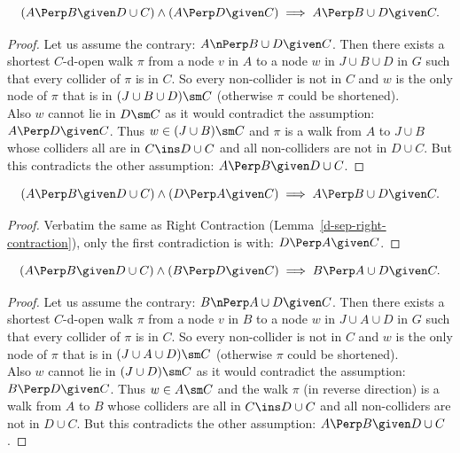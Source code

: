 \begin{Lem}
  \label{d-sep-right-contraction}
    \[ (A \Perp  B \given D \cup  C) \land (A \Perp  D \given C)  \implies A \Perp  B \cup  D \given C.\]
\begin{proof}
    Let us assume the contrary:  $A  \nPerp  B \cup D \given C$.
    Then there exists a shortest $C$-d-open walk $\pi$ 
    from a node $v$ in $A$ to a node $w$ in $J \cup B \cup D$ in $G$ such that  every collider of $\pi$ is in $C$.
    So every non-collider is not in $C$ and $w$ is 
    the only node of $\pi$ that is in $(J \cup B \cup D)\sm C$ (otherwise $\pi$ could be shortened). \\
    Also $w$ cannot lie in $D\sm C$ as it would contradict the assumption: $A \Perp  D \given C$.
    Thus $w \in (J \cup B) \sm C$ and $\pi$ is a walk from $A$ to $J \cup B$ whose colliders all are in $C \ins D \cup C$ 
    and all non-colliders are not in $D \cup C$.
    But this contradicts the other assumption: $A \Perp  B \given D \cup  C$.
\end{proof}
\end{Lem}

\begin{Lem}
    \[ (A \Perp  B \given D \cup  C) \land (D \Perp  A \given C) \implies A  \Perp  B \cup  D \given C.\]
\begin{proof}
    Verbatim the same as Right Contraction (Lemma~\ref{d-sep-right-contraction}), 
    only the first contradiction is with: $D \Perp A \given C$.
\end{proof}
\end{Lem}

\begin{Lem}
    \label{d-sep-flc-contraction}
    \[ (A \Perp  B \given D \cup  C) \land (B \Perp  D \given C) \implies B \Perp  A \cup  D \given C.\]
\begin{proof}
    Let us assume the contrary:  $B  \nPerp  A \cup D \given C$.
    Then there exists a shortest $C$-d-open walk $\pi$ 
    from a node $v$ in $B$ to a node $w$ in $J \cup A \cup D$ in $G$ such that every collider of $\pi$ is in $C$.
    So every non-collider is not in $C$ and $w$ is 
    the only node of $\pi$ that is in $(J \cup A \cup D)\sm C$ (otherwise $\pi$ could be shortened). \\
    Also $w$ cannot lie in $(J \cup D) \sm C$ as it would contradict the assumption: $B \Perp  D \given C$.
    Thus $w \in A \sm C$ and the walk $\pi$ (in reverse direction) is a walk from $A$ to $B$ whose colliders are all in 
    $C \ins D \cup C$ 
    and all non-colliders are not in $D \cup C$.
    But this contradicts the other assumption: $A \Perp  B \given D \cup  C$.
\end{proof}
\end{Lem}


